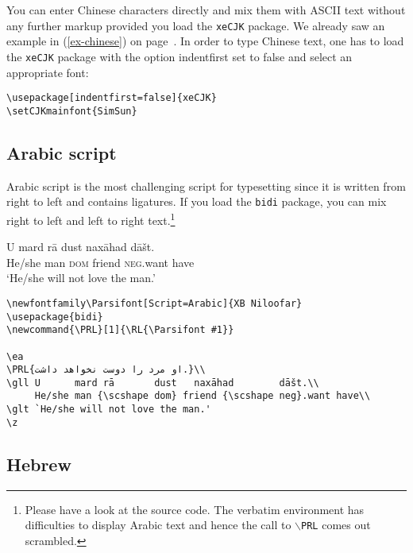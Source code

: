 You can enter Chinese characters directly and mix them with ASCII text without any further markup
provided you load the \texttt{xeCJK} package. We already saw an example in (\ref{ex-chinese}) on
page~\pageref{ex-chinese}. In order to type Chinese text, one has to load the \texttt{xeCJK} package
with the option {\bs}indentfirst set to {\bs}false and select an appropriate font:
\begin{verbatim}
\usepackage[indentfirst=false]{xeCJK}
\setCJKmainfont{SimSun}
\end{verbatim}


\subsection{Arabic script}

Arabic script is the most challenging script for typesetting since it is written from right to left
and contains ligatures. If you load the \texttt{bidi} package, you can mix right to left and left to
right text.\footnote{
  Please have a look at the source code. The verbatim environment has difficulties to display Arabic
  text and hence the call to \texttt{$\backslash$PRL} comes out scrambled.
}

\ea
 \gll U      mard rā        dust   naxāhad        dāšt.\\
      He/she man  {\scshape dom} friend {\scshape neg}.want have\\
\glt `He/she will not love the man.'
\z

\begin{verbatim}
\newfontfamily\Parsifont[Script=Arabic]{XB Niloofar}
\usepackage{bidi}
\newcommand{\PRL}[1]{\RL{\Parsifont #1}}

\ea
\PRL{او مرد را دوست نخواهد داشت.}\\
\gll U      mard rā       dust   naxāhad        dāšt.\\
     He/she man {\scshape dom} friend {\scshape neg}.want have\\
\glt `He/she will not love the man.'
\z
\end{verbatim}

\subsection{Hebrew}

